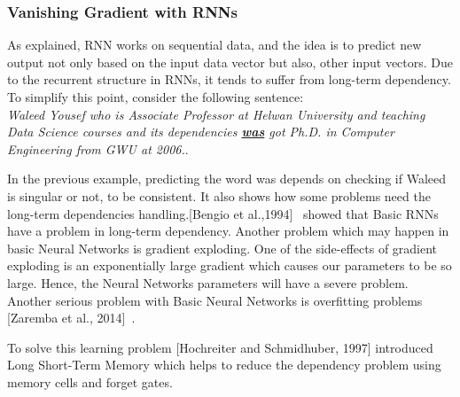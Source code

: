  \subsubsection{Vanishing Gradient with RNNs}\label{Sec:RNN_Vanishing}
 
As explained, RNN works on sequential data, and the idea is to predict new output not only based on the input data vector but also, other input vectors. Due to the recurrent structure in RNNs, it tends to suffer from long-term dependency. To simplify this point, consider the following sentence:\\
 \textit{Waleed Yousef who is Associate Professor at Helwan University and teaching Data Science courses and its dependencies \textbf{\underline{was}} got Ph.D. in Computer Engineering from GWU at 2006.}.

 In the previous example, predicting the word was depends on checking if Waleed is singular or not, to be consistent. It also shows how some problems need the long-term dependencies handling.[Bengio et al.,1994]~\cite{Bengio_1994} showed that Basic RNNs have a problem in long-term dependency.  Another problem which may happen in basic Neural Networks is gradient exploding. One of the side-effects of gradient exploding is an exponentially large gradient which causes our parameters to be so large. Hence, the Neural Networks parameters will have a severe problem. Another serious problem with Basic Neural Networks is overfitting problems [Zaremba et al., 2014]~\cite{Zaremba_et_al}.

 To solve this learning problem [Hochreiter and Schmidhuber, 1997] introduced Long Short-Term Memory which helps to reduce the dependency problem using memory cells and forget gates.

